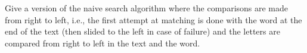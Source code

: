 Give a version of the naive search algorithm where the comparisons are
made from right to left, i.e., the first attempt at matching is done
with the word at the end of the text (then slided to the left in case
of failure) and the letters are compared from right to left in the
text and the word.
